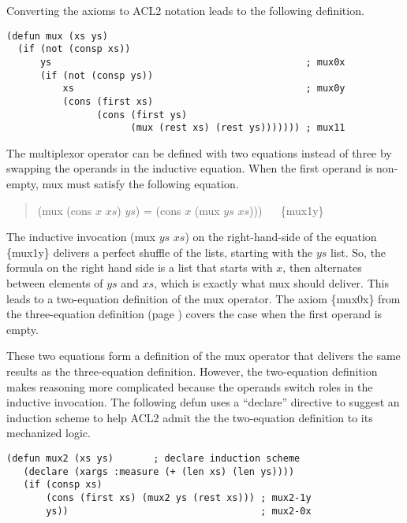 Converting the axioms to ACL2 notation leads to the following
definition.

\label{mux-defun}
\begin{Verbatim}
(defun mux (xs ys)
  (if (not (consp xs))
      ys                                             ; mux0x
      (if (not (consp ys))
          xs                                         ; mux0y
          (cons (first xs)
                (cons (first ys)
                      (mux (rest xs) (rest ys))))))) ; mux11
\end{Verbatim}

\begin{aside}
The multiplexor operator can be defined with two equations instead of three
by swapping the operands in the inductive equation.
When the first operand is non-empty, mux must satisfy the following equation.
\begin{quote}
(mux (cons $x$ $xs$) $ys$) = (cons $x$ (mux $ys$ $xs$))) ~~ \{mux1y\}
\end{quote}

The inductive invocation (mux $ys$ $xs$)
on the right-hand-side of the equation \{mux1y\}
delivers a perfect shuffle of the lists,
starting with the $ys$ list.
So, the formula on the right hand side is a list that starts with $x$,
then alternates between elements of $ys$ and $xs$, which is exactly what
mux should deliver. This leads to a two-equation definition of the mux operator.
The axiom \{mux0x\} from the three-equation definition
(page \pageref{def:mux})
covers the case when the first operand is empty.

These two equations form a definition of the mux operator
that delivers the same results as the three-equation definition.
However, the two-equation definition makes reasoning more complicated
because the operands switch roles in the inductive invocation.
The following defun uses a ``declare'' directive to suggest
an induction scheme to help ACL2 admit
the the two-equation definition to its mechanized logic.

\label{mux-2eq-defun}
\begin{Verbatim}
(defun mux2 (xs ys)       ; declare induction scheme
   (declare (xargs :measure (+ (len xs) (len ys))))
   (if (consp xs)
       (cons (first xs) (mux2 ys (rest xs))) ; mux2-1y
       ys))                                  ; mux2-0x
\end{Verbatim}

\caption{Defining mux with Two Equations}
\label{aside:mux-2eq}
\end{aside}

